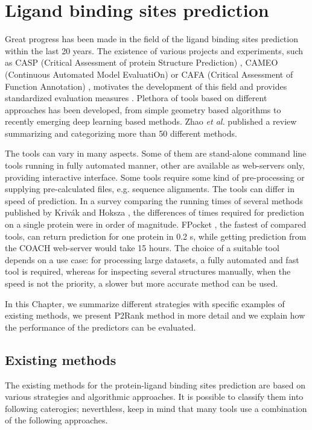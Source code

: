\chapter{Ligand binding sites prediction} \label{ch:2}

Great progress has been made in the field of the ligand binding sites prediction within the last 20 years. The existence of various projects and experiments, such as CASP (Critical Assessment of protein Structure Prediction) \cite{casp_def}, CAMEO (Continuous Automated Model EvaluatiOn) \cite{cameo} or CAFA (Critical Assessment of Function Annotation) \cite{cafa}, motivates the development of this field and provides standardized evaluation measures \cite{methods}. Plethora of tools based on different approaches has been developed, from simple geometry based algorithms to recently emerging deep learning based methods. Zhao \textit{et al.} \cite{methods} published a review summarizing and categorizing more than 50 different methods.

The tools can vary in many aspects. Some of them are stand-alone command line tools running in fully automated manner, other are available as web-servers only, providing interactive interface. Some tools require some kind of pre-processing or supplying pre-calculated files, e.g. sequence alignments. The tools can differ in speed of prediction. In a survey comparing the running times of several methods published by Krivák and Hoksza \cite{p2rank1}, the differences of times required for prediction on a single protein were in order of magnitude. FPocket \cite{fpocket}, the fastest of compared tools, can return prediction for one protein in 0.2 s, while getting prediction from the COACH web-server \cite{coach} would take 15 hours. The choice of a suitable tool depends on a use case: for processing large datasets, a fully automated and fast tool is required, whereas for inspecting several structures manually, when the speed is not the priority, a slower but more accurate method can be used.

In this Chapter, we summarize different strategies with specific examples of existing methods, we present P2Rank method in more detail and we explain how the performance of the predictors can be evaluated.

\section{Existing methods}

The existing methods for the protein-ligand binding sites prediction are based on various strategies and algorithmic approaches. It is possible to classify them into following caterogies; neverthless, keep in mind that many tools use a combination of the following approaches.

